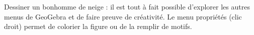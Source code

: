 \begin{activite}
     \partie[défi !!!]
        Dessiner un bonhomme de neige : il est tout à fait possible d'explorer les autres menus de GeoGebra et de faire preuve de créativité. Le menu propriétés (clic droit) permet de colorier la figure ou de la remplir de motifs. \medskip
\end{activite}
